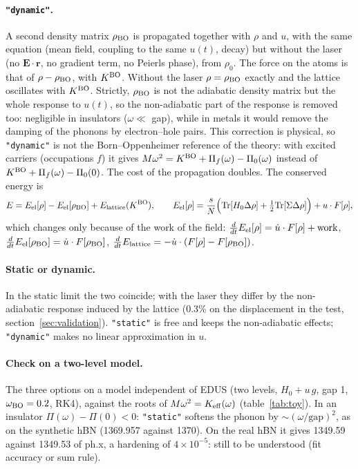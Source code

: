 \documentclass[11pt]{article}
\newcommand{\Dr}{\Delta\rho}
\begin{document}
\paragraph{\texttt{"dynamic"}.} A second density matrix $\rho_{\rm BO}$ is propagated together with $\rho$ and $u$, with
the same equation (mean field, coupling to the same $u(t)$, decay) but without the laser (no $\mathbf E\cdot\mathbf r$, no
gradient term, no Peierls phase), from $\rho_0$. The force on the atoms is that of $\rho-\rho_{\rm BO}$, with $K^{\rm BO}$.
Without the laser $\rho=\rho_{\rm BO}$ exactly and the lattice oscillates with $K^{\rm BO}$. Strictly, $\rho_{\rm BO}$ is not
the adiabatic density matrix but the whole response to $u(t)$, so the non-adiabatic part of the response is removed too:
negligible in insulators ($\omega\ll$ gap), while in metals it would remove the damping of the phonons by electron--hole
pairs. This correction is physical, so \texttt{"dynamic"} is not the Born--Oppenheimer reference of the theory: with
excited carriers (occupations $f$) it gives $M\omega^2 = K^{\rm BO}+\Pi_f(\omega)-\Pi_0(\omega)$ instead of
$K^{\rm BO}+\Pi_f(\omega)-\Pi_0(0)$. The cost of the propagation doubles. The conserved energy is
\begin{equation}
E = E_{\rm el}[\rho] - E_{\rm el}[\rho_{\rm BO}] + E_{\rm lattice}(K^{\rm BO}),\qquad
E_{\rm el}[\rho] = \frac sN\Big(\mathrm{Tr}[H_0\Dr]+\tfrac12\mathrm{Tr}[\Sigma\Dr]\Big) + u\cdot F[\rho],
\end{equation}
which changes only because of the work of the field: $\frac{d}{dt}E_{\rm el}[\rho] = \dot u\cdot F[\rho] + \text{work}$,
$\frac{d}{dt}E_{\rm el}[\rho_{\rm BO}] = \dot u\cdot F[\rho_{\rm BO}]$, $\frac{d}{dt}E_{\rm lattice} = -\dot u\cdot(F[\rho]-F[\rho_{\rm BO}])$.

\paragraph{Static or dynamic.} In the static limit the two coincide; with the laser they differ by the non-adiabatic
response induced by the lattice (0.3\% on the displacement in the test, section~\ref{sec:validation}). \texttt{"static"}
is free and keeps the non-adiabatic effects; \texttt{"dynamic"} makes no linear approximation in $u$.

\paragraph{Check on a two-level model.} The three options on a model independent of EDUS (two levels, $H_0+u\,g$, gap 1,
$\omega_{\rm BO}=0.2$, RK4), against the roots of $M\omega^2=K_{\rm eff}(\omega)$ (table~\ref{tab:toy}). In an insulator
$\Pi(\omega)-\Pi(0)<0$: \texttt{"static"} softens the phonon by $\sim(\omega/\text{gap})^2$, as on the synthetic hBN (1369.957
against 1370). On the real hBN it gives 1349.59 against 1349.53 of ph.x, a hardening of $4\times10^{-5}$: still to be
understood (fit accuracy or sum rule).
\end{document}
